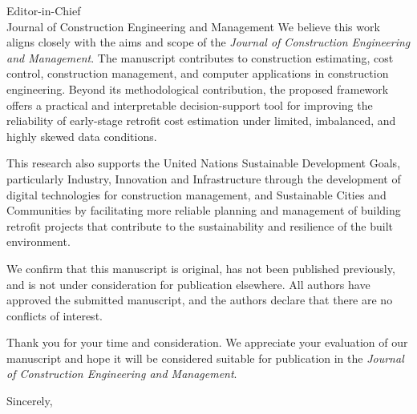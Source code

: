 \documentclass[11pt]{letter}
\begin{document}
\begin{letter}{Editor-in-Chief\\Journal of Construction Engineering and Management}
We believe this work aligns closely with the aims and scope of the \textit{Journal of Construction Engineering and Management}. The manuscript contributes to construction estimating, cost control, construction management, and computer applications in construction engineering. Beyond its methodological contribution, the proposed framework offers a practical and interpretable decision-support tool for improving the reliability of early-stage retrofit cost estimation under limited, imbalanced, and highly skewed data conditions.

This research also supports the United Nations Sustainable Development Goals, particularly Industry, Innovation and Infrastructure through the development of digital technologies for construction management, and Sustainable Cities and Communities by facilitating more reliable planning and management of building retrofit projects that contribute to the sustainability and resilience of the built environment.

We confirm that this manuscript is original, has not been published previously, and is not under consideration for publication elsewhere. All authors have approved the submitted manuscript, and the authors declare that there are no conflicts of interest.

Thank you for your time and consideration. We appreciate your evaluation of our manuscript and hope it will be considered suitable for publication in the \textit{Journal of Construction Engineering and Management}.

\closing{Sincerely,}

\end{letter}
\end{document}
